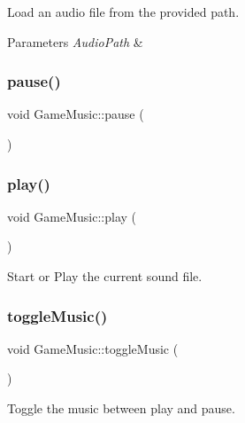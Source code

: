 Load an audio file from the provided path. 


\begin{DoxyParams}{Parameters}
{\em Audio\+Path} & \\
\hline
\end{DoxyParams}
\mbox{\label{class_game_music_a763d190d8727abe9eb47acddc5cf0008}} 
\subsubsection{\texorpdfstring{pause()}{pause()}}
{\footnotesize\ttfamily void Game\+Music\+::pause (\begin{DoxyParamCaption}{ }\end{DoxyParamCaption})\hspace{0.3cm}{\ttfamily [private]}}

\mbox{\label{class_game_music_a88151bbcf754b0dc87e75cf5949b7602}} 
\subsubsection{\texorpdfstring{play()}{play()}}
{\footnotesize\ttfamily void Game\+Music\+::play (\begin{DoxyParamCaption}{ }\end{DoxyParamCaption})}



Start or Play the current sound file. 

\mbox{\label{class_game_music_ac14197e5734c1934ca85666c14a7a1c3}} 
\subsubsection{\texorpdfstring{toggle\+Music()}{toggleMusic()}}
{\footnotesize\ttfamily void Game\+Music\+::toggle\+Music (\begin{DoxyParamCaption}{ }\end{DoxyParamCaption})}



Toggle the music between play and pause. 



